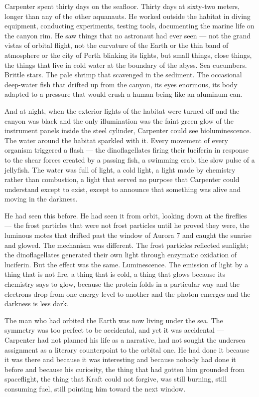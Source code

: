 \documentclass[12pt, letterpaper]{article}
\begin{document}
Carpenter spent thirty days on the seafloor. Thirty days at sixty-two meters, longer than any of the other aquanauts. He worked outside the habitat in diving equipment, conducting experiments, testing tools, documenting the marine life on the canyon rim. He saw things that no astronaut had ever seen --- not the grand vistas of orbital flight, not the curvature of the Earth or the thin band of atmosphere or the city of Perth blinking its lights, but small things, close things, the things that live in cold water at the boundary of the abyss. Sea cucumbers. Brittle stars. The pale shrimp that scavenged in the sediment. The occasional deep-water fish that drifted up from the canyon, its eyes enormous, its body adapted to a pressure that would crush a human being like an aluminum can.

And at night, when the exterior lights of the habitat were turned off and the canyon was black and the only illumination was the faint green glow of the instrument panels inside the steel cylinder, Carpenter could see bioluminescence. The water around the habitat sparkled with it. Every movement of every organism triggered a flash --- the dinoflagellates firing their luciferin in response to the shear forces created by a passing fish, a swimming crab, the slow pulse of a jellyfish. The water was full of light, a cold light, a light made by chemistry rather than combustion, a light that served no purpose that Carpenter could understand except to exist, except to announce that something was alive and moving in the darkness.

He had seen this before. He had seen it from orbit, looking down at the fireflies --- the frost particles that were not frost particles until he proved they were, the luminous motes that drifted past the window of Aurora 7 and caught the sunrise and glowed. The mechanism was different. The frost particles reflected sunlight; the dinoflagellates generated their own light through enzymatic oxidation of luciferin. But the effect was the same. Luminescence. The emission of light by a thing that is not fire, a thing that is cold, a thing that glows because its chemistry says to glow, because the protein folds in a particular way and the electrons drop from one energy level to another and the photon emerges and the darkness is less dark.

The man who had orbited the Earth was now living under the sea. The symmetry was too perfect to be accidental, and yet it was accidental --- Carpenter had not planned his life as a narrative, had not sought the undersea assignment as a literary counterpoint to the orbital one. He had done it because it was there and because it was interesting and because nobody had done it before and because his curiosity, the thing that had gotten him grounded from spaceflight, the thing that Kraft could not forgive, was still burning, still consuming fuel, still pointing him toward the next window.
\end{document}
